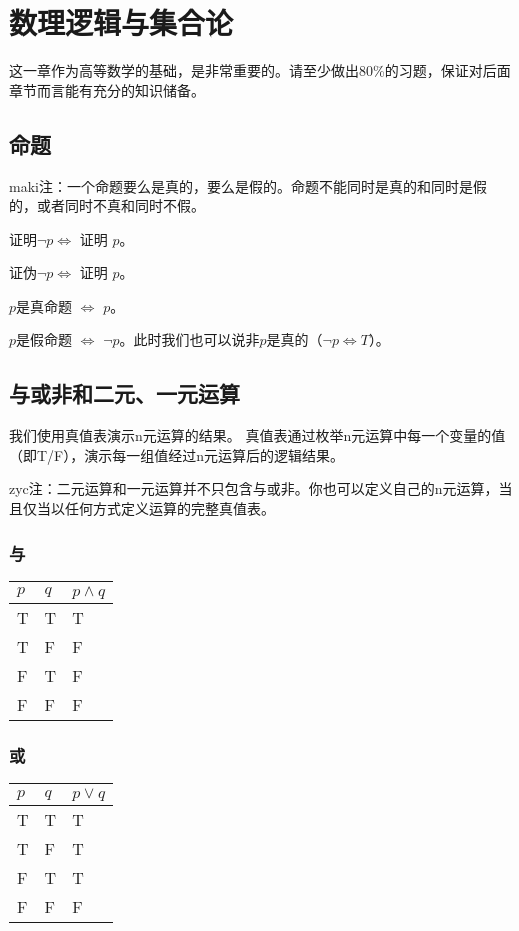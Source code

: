 
\section{数理逻辑与集合论}
这一章作为高等数学的基础，是非常重要的。请至少做出80\%的习题，保证对后面章节而言能有充分的知识储备。

\subsection{命题}
maki注：一个命题要么是真的，要么是假的。命题不能同时是真的和同时是假的，或者同时不真和同时不假。

证明$\neg p \iff$ 证明 $p$。

证伪$\neg p \iff$ 证明 $p$。

$p$是真命题 $\iff$ $p$。

$p$是假命题 $\iff$ $\neg p$。此时我们也可以说非$p$是真的（$\neg p \iff T$）。

\subsection{与或非和二元、一元运算}

我们使用真值表演示n元运算的结果。
真值表通过枚举n元运算中每一个变量的值（即T/F），演示每一组值经过n元运算后的逻辑结果。

zyc注：二元运算和一元运算并不只包含与或非。你也可以定义自己的n元运算，当且仅当以任何方式定义运算的完整真值表。

\subsubsection{与}

\begin{table}[H]
    \begin{tabular}{ll|l}
    $p$ & $q$   & $p \wedge q$ \\ \hline 
    T   & T     & T            \\
    T   & F     & F            \\
    F   & T     & F            \\
    F   & F     & F                        
    \end{tabular}
\end{table}

\subsubsection{或}

\begin{table}[H]
    \begin{tabular}{ll|l}
    $p$ & $q$   & $p \vee q$ \\ \hline 
    T   & T     & T            \\
    T   & F     & T            \\
    F   & T     & T            \\
    F   & F     & F                        
    \end{tabular}
\end{table}

